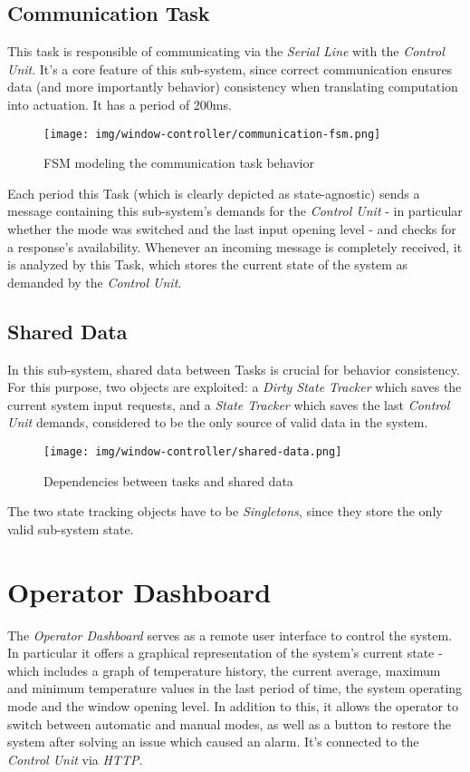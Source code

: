 \documentclass[a4paper,12pt]{report}
\begin{document}
		\subsection{Communication Task}
		This task is responsible of communicating via the \textit{Serial Line} with the \textit{Control Unit}. It's a core feature of this sub-system, since correct communication ensures data (and more importantly behavior) consistency when translating computation into actuation. It has a period of 200ms.
		\begin{figure}[H]
			\centering{}
			\texttt{[image: img/window-controller/communication-fsm.png]}
			\caption{FSM modeling the communication task behavior}
			\label{img:window-controller/communication-fsm}
		\end{figure}
		Each period this Task (which is clearly depicted as state-agnostic) sends a message containing this sub-system's demands for the \textit{Control Unit} - in particular whether the mode was switched and the last input opening level - and checks for a response's availability. Whenever an incoming message is completely received, it is analyzed by this Task, which stores the current state of the system as demanded by the \textit{Control Unit}.
		\subsection{Shared Data}
		In this sub-system, shared data between Tasks is crucial for behavior consistency. For this purpose, two objects are exploited: a \textit{Dirty State Tracker} which saves the current system input requests, and a \textit{State Tracker} which saves the last \textit{Control Unit} demands, considered to be the only source of valid data in the system.
		\begin{figure}[H]
			\centering{}
			\texttt{[image: img/window-controller/shared-data.png]}
			\caption{Dependencies between tasks and shared data}
			\label{img:window-controller/shared-data}
		\end{figure}
		The two state tracking objects have to be \textit{Singletons}, since they store the only valid sub-system state.
	\section{Operator Dashboard}
	The \textit{Operator Dashboard} serves as a remote user interface to control the system. In particular it offers a graphical representation of the system's current state - which includes a graph of temperature history, the current average, maximum and minimum temperature values in the last period of time, the system operating mode and the window opening level. In addition to this, it allows the operator to switch between automatic and manual modes, as well as a button to restore the system after solving an issue which caused an alarm. It's connected to the \textit{Control Unit} via \textit{HTTP}.
\end{document}
